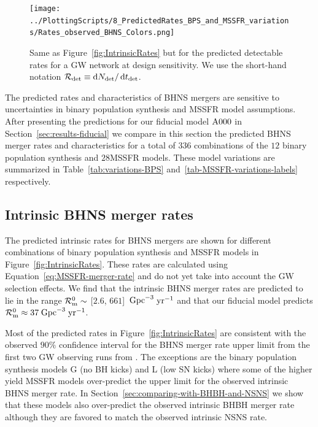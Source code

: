 \documentclass[twocolumn]{aastex63}
\newcommand\rate{\mathcal{R}}
\newcommand\bhnsSingle{BHNS\xspace}
\newcommand{\yearmin}{\ensuremath{\,\rm{yr}^{-1}}\xspace}
\newcommand{\GpcminThree}{\ensuremath{\,\rm{Gpc}^{-3}}\xspace}
\newcommand{\tdet}{\ensuremath{{t}_{\rm{det}}}\xspace}
\newcommand{\Ndet}{\ensuremath{{N}_{\rm{det}}}\xspace}
\newcommand*\diff{\mathop{}\!\mathrm{d}}
\newcommand{\mAzero}{\ensuremath{\rm{A}000}\xspace}
\newcommand{\Nmodels}{\ensuremath{336}\xspace}
\newcommand{\NmodelsBPS}{\ensuremath{12}\xspace}
\newcommand{\NmodelsMSSFR}{\ensuremath{28}\xspace}
\newcommand{\RateIntrinsicZero}{\ensuremath{\mathcal{R}_{\rm{m}}^{0}}\xspace}
\newcommand{\RateIntrinsicAzeroBHNS}{\ensuremath{37}\xspace}
\newcommand{\RateIntrinsicAzeroBHNSmin}{\ensuremath{2.6}\xspace}
\newcommand{\RateIntrinsicAzeroBHNSmax}{\ensuremath{661}\xspace}
\begin{document}
%
\begin{figure}
    \centering
\texttt{[image: ../PlottingScripts/8\_PredictedRates\_BPS\_and\_MSSFR\_variations/Rates\_observed\_BHNS\_Colors.png]} %
    \caption{Same as Figure~\ref{fig:IntrinsicRates} but for the predicted  detectable rates for a \ac{GW} network at design sensitivity. We use the short-hand notation $\rate_{\rm{det}} \equiv \diff \Ndet / \diff \tdet$.}%
    \label{fig:ObservedRates}
\end{figure}
%


The predicted rates and characteristics of  \bhnsSingle mergers are sensitive to uncertainties in binary population synthesis and \ac{MSSFR}  model assumptions. 
After presenting the predictions for our fiducial model  \mAzero in Section~\ref{sec:results-fiducial} we compare in this section the predicted \bhnsSingle merger rates and characteristics for a total of \Nmodels  combinations of the \NmodelsBPS binary population synthesis and  \NmodelsMSSFR \ac{MSSFR} models. 
These model variations are summarized in Table~\ref{tab:variations-BPS} and~\ref{tab-MSSFR-variations-labels} respectively.  







\subsection{Intrinsic \bhnsSingle merger rates}
\label{subsec:results-variations-rates}
%
The predicted intrinsic rates for \bhnsSingle mergers are shown for different combinations of binary population synthesis and \ac{MSSFR} models in Figure~\ref{fig:IntrinsicRates}. 
These rates are calculated using Equation~\ref{eq:MSSFR-merger-rate}  and do not yet take into account the \ac{GW} selection effects.  
We find that the intrinsic \bhnsSingle merger rates are predicted to lie in the range $\rate_{\rm{m}}^0 \sim$ [\RateIntrinsicAzeroBHNSmin, \RateIntrinsicAzeroBHNSmax]  \GpcminThree \yearmin  and that our fiducial model predicts $\RateIntrinsicZero \approx \RateIntrinsicAzeroBHNS $\GpcminThree \yearmin.

Most of the predicted rates in Figure~\ref{fig:IntrinsicRates} are consistent with the observed $90\%$ confidence interval  for the \bhnsSingle merger rate upper limit from the first two \ac{GW} observing runs from \citet{2019PhRvX...9c1040A}. 
The exceptions are  the binary population synthesis models {G} (no BH kicks) and {L}  (low SN kicks) where some of the higher yield \ac{MSSFR} models  over-predict the upper limit for the observed intrinsic \bhnsSingle merger rate. 
In Section~\ref{sec:comparing-with-BHBH-and-NSNS} we show that these models also over-predict the observed intrinsic \ac{BHBH} merger rate although they are favored to match the observed intrinsic \ac{NSNS} rate. 
\end{document}
